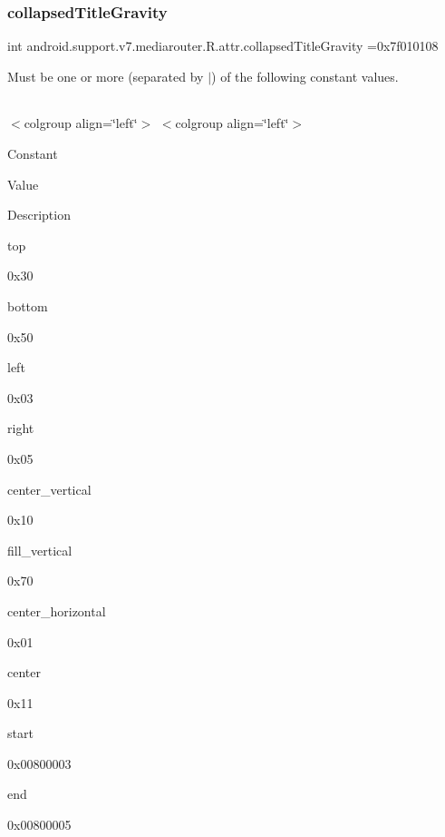 \subsubsection{\texorpdfstring{collapsed\+Title\+Gravity}{collapsedTitleGravity}}
{\footnotesize\ttfamily int android.\+support.\+v7.\+mediarouter.\+R.\+attr.\+collapsed\+Title\+Gravity =0x7f010108\hspace{0.3cm}{\ttfamily [static]}}

Must be one or more (separated by \textquotesingle{}$\vert$\textquotesingle{}) of the following constant values.

\tabulinesep=1mm
\begin{longtabu} spread 0pt [c]{*{0}{|X[-1]}|}
\hline
\end{longtabu}
$<$colgroup align=\char`\"{}left\char`\"{}$>$ $<$colgroup align=\char`\"{}left\char`\"{}$>$ 

Constant

Value

Description 

{\ttfamily top}

0x30

{\ttfamily bottom}

0x50

{\ttfamily left}

0x03

{\ttfamily right}

0x05

{\ttfamily center\+\_\+vertical}

0x10

{\ttfamily fill\+\_\+vertical}

0x70

{\ttfamily center\+\_\+horizontal}

0x01

{\ttfamily center}

0x11

{\ttfamily start}

0x00800003

{\ttfamily end}

0x00800005\mbox{\label{classandroid_1_1support_1_1v7_1_1mediarouter_1_1R_1_1attr_a2993405c76ed4757e250557ecbdc4943}} 

